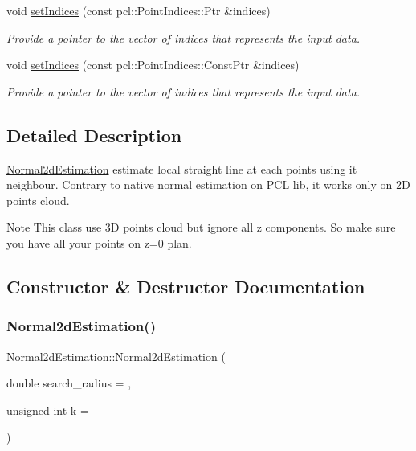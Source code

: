 \begin{DoxyCompactItemize}
void \hyperlink{classNormal2dEstimation_a91bb44f43f09aa33f3c447cfe2cde6b3}{set\+Indices} (const pcl\+::\+Point\+Indices\+::\+Ptr \&indices)
\begin{DoxyCompactList}\small\item\em Provide a pointer to the vector of indices that represents the input data. \end{DoxyCompactList}\item 
void \hyperlink{classNormal2dEstimation_a57a561d5d51d42584687dd4a3d29defd}{set\+Indices} (const pcl\+::\+Point\+Indices\+::\+Const\+Ptr \&indices)
\begin{DoxyCompactList}\small\item\em Provide a pointer to the vector of indices that represents the input data. \end{DoxyCompactList}\end{DoxyCompactItemize}


\subsection{Detailed Description}
\hyperlink{classNormal2dEstimation}{Normal2d\+Estimation} estimate local straight line at each points using it neighbour. Contrary to native normal estimation on P\+CL lib, it works only on 2D points cloud. 

\begin{DoxyNote}{Note}
This class use 3D points cloud but ignore all z components. So make sure you have all your points on z=0 plan. 
\end{DoxyNote}


\subsection{Constructor \& Destructor Documentation}
\mbox{\label{classNormal2dEstimation_ac93035a8de2a45651571f7f6022f18b7}} 
\subsubsection{\texorpdfstring{Normal2d\+Estimation()}{Normal2dEstimation()}}
{\footnotesize\ttfamily Normal2d\+Estimation\+::\+Normal2d\+Estimation (\begin{DoxyParamCaption}\item[{double}]{search\+\_\+radius = {},  }\item[{unsigned int}]{k = {} }\end{DoxyParamCaption})\hspace{0.3cm}{\ttfamily [inline]}}



